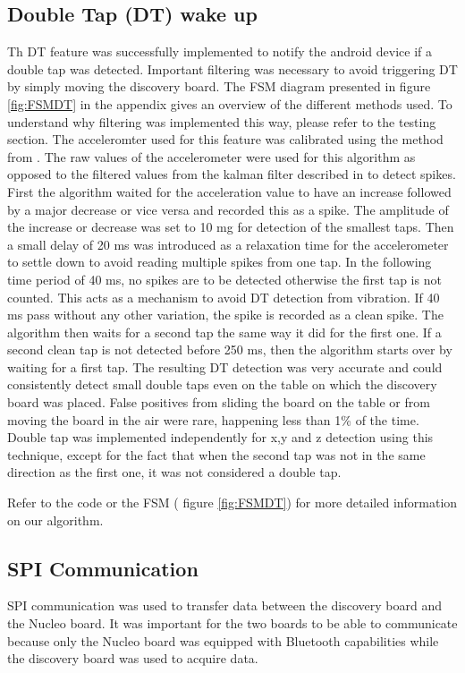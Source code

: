 \documentclass[12pt]{article}
\begin{document}
\subsection{Double Tap (DT) wake up}
Th DT feature was successfully implemented to notify the android device if a double tap was detected. Important filtering was necessary to avoid triggering DT by simply moving the discovery board. The FSM diagram presented in figure \ref{fig:FSMDT} in the appendix gives an overview of the different methods used. To understand why filtering was implemented this way, please refer to the testing section. The acceleromter used for this feature was calibrated using the method from \cite{Lab4report}. The raw values of the accelerometer were used for this algorithm as opposed to the filtered values from the kalman filter described in \cite{Lab2report} to detect spikes. First the algorithm waited for the acceleration value to have an increase followed by a major decrease or vice versa and recorded this as a spike. The amplitude of the increase or decrease was set to 10 mg for detection of the smallest taps. Then a small delay of 20 ms was introduced as a relaxation time for the accelerometer to settle down to avoid reading multiple spikes from one tap. In the following time period of 40 ms, no spikes are to be detected otherwise the first tap is not counted. This acts as a mechanism to avoid DT detection from vibration. If 40 ms pass without any other variation, the spike is recorded as a clean spike. The algorithm then waits for a second tap the same way it did for the first one. If a second clean tap is not detected before 250 ms, then the algorithm starts over by waiting for a first tap.
The resulting DT detection was very accurate and could consistently detect small double taps even on the table on which the discovery board was placed. False positives from sliding the board on the table or from moving the board in the air were rare, happening less than 1\% of the time.
Double tap was implemented independently for x,y and z detection using this technique, except for the fact that when the second tap was not in the same direction as the first one, it was not considered a double tap.

Refer to the code or the FSM ( figure \ref{fig:FSMDT}) for more detailed information on our algorithm.
\subsection{SPI Communication}
SPI communication was used to transfer data between the discovery board and the Nucleo board. It was important for the two boards to be able to communicate because only the Nucleo board was equipped with Bluetooth capabilities while the discovery board was used to acquire data.
 
\end{document}
